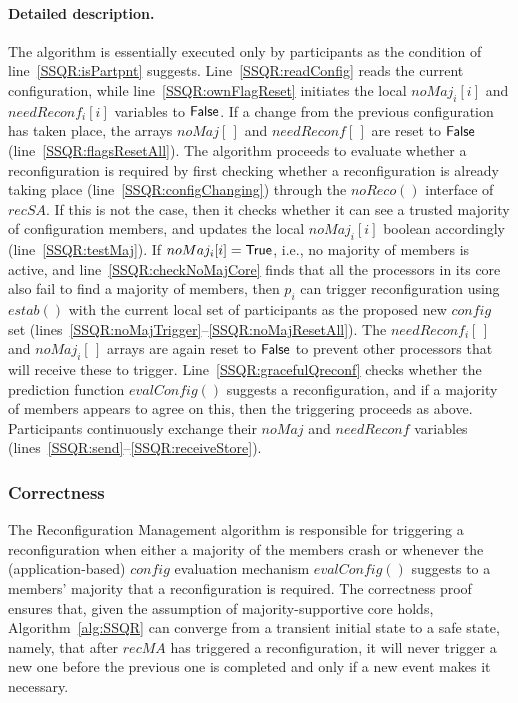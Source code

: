 \documentclass[11pt]{article}
\newcommand{\noReconfig}{noReco}
\newcommand{\configEstab}{estab}
\begin{document}
\paragraph{Detailed description.}
The algorithm is essentially executed only by participants as the condition of line~\ref{SSQR:isPartpnt} suggests.
Line~\ref{SSQR:readConfig} reads the current configuration, while line~\ref{SSQR:ownFlagReset} initiates the local $noMaj_i[i]$ and $needReconf_i[i]$ variables to $\sf False$. 
If a change from the previous configuration has taken place, the arrays $noMaj[\,]$ and $needReconf[\,]$ are reset to $\sf False$ (line~\ref{SSQR:flagsResetAll}).
The algorithm proceeds to evaluate whether a reconfiguration is required by first checking whether a reconfiguration is already taking place (line~\ref{SSQR:configChanging}) through the $\noReconfig()$ interface of $recSA$.
If this is not the case, then it checks whether it can see a trusted majority of configuration members, and updates the local $noMaj_i[i]$ boolean accordingly (line~\ref{SSQR:testMaj}).
If $noMaj_i[i] = \sf True$, i.e., no majority of members is active, and line~\ref{SSQR:checkNoMajCore} finds that all the processors in its core also fail to find a majority of members, then $p_i$ can trigger reconfiguration using $\configEstab()$ with the current local set of participants as the proposed new $config$ set (lines~\ref{SSQR:noMajTrigger}--\ref{SSQR:noMajResetAll}).
The $needReconf_i[\,]$ and $noMaj_i[\,]$ arrays are again reset to $\sf False$ to prevent other processors that will receive these to trigger.
Line~\ref{SSQR:gracefulQreconf} checks whether the prediction function $evalConfig()$ suggests a reconfiguration, and if a majority of members appears to agree on this, then the triggering proceeds as above.
Participants continuously exchange their $noMaj$ and $needReconf$ variables (lines~\ref{SSQR:send}--\ref{SSQR:receiveStore}). 










\subsubsection{Correctness}
The Reconfiguration Management algorithm is responsible for triggering a reconfiguration when either a majority of the members crash or whenever the (application-based) $config$ evaluation mechanism $evalConfig()$ suggests to a members' majority that a reconfiguration is required. 
The correctness proof ensures that, given the assumption of majority-supportive core holds, Algorithm~\ref{alg:SSQR} can converge from a transient initial state to a safe state, namely, that after $recMA$ has triggered a reconfiguration, it will never trigger a new one before the previous one is completed and only if a new event makes it necessary.
\end{document}
